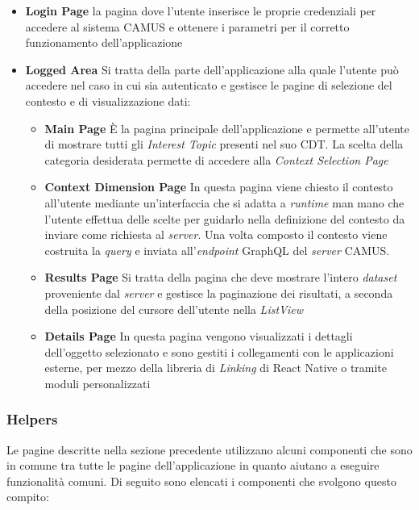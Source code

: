 \begin{itemize}
	\item \textbf{Login Page}
	\upe la pagina dove l'utente inserisce le proprie credenziali per accedere al sistema CAMUS e ottenere i parametri per il corretto funzionamento dell'applicazione
	\item \textbf{Logged Area}
	Si tratta della parte dell'applicazione alla quale l'utente può accedere nel caso in cui sia autenticato e gestisce le pagine di selezione del contesto e di visualizzazione dati:
	\begin{itemize}
		\item \textbf{Main Page}
		È la pagina principale dell'applicazione e permette all'utente di mostrare tutti gli \emph{Interest Topic} presenti nel suo CDT. La scelta della categoria desiderata permette di accedere alla \emph{Context Selection Page}
		\item \textbf{Context Dimension Page}
		In questa pagina viene chiesto il contesto all'utente mediante un'interfaccia che si adatta a \emph{runtime} man mano che l'utente effettua delle scelte per guidarlo nella definizione del contesto da inviare come richiesta al \emph{server}. Una volta composto il contesto viene costruita la \emph{query} e inviata all'\emph{endpoint} GraphQL del \emph{server} CAMUS. 
		\item \textbf{Results Page}
		Si tratta della pagina che deve mostrare l'intero \emph{dataset} proveniente dal \emph{server} e gestisce la paginazione dei risultati, a seconda della posizione del cursore dell'utente nella \emph{ListView} 
		\item \textbf{Details Page}
		In questa pagina vengono visualizzati i dettagli dell'oggetto selezionato e sono gestiti i collegamenti con le applicazioni esterne, per mezzo della libreria di \emph{Linking} di React Native o tramite moduli personalizzati
	\end{itemize}
\end{itemize}

\subsubsection{Helpers}

Le pagine descritte nella sezione precedente utilizzano alcuni componenti che sono in comune tra tutte le pagine dell'applicazione in quanto aiutano a eseguire funzionalità comuni. Di seguito sono elencati i componenti che svolgono questo compito:

